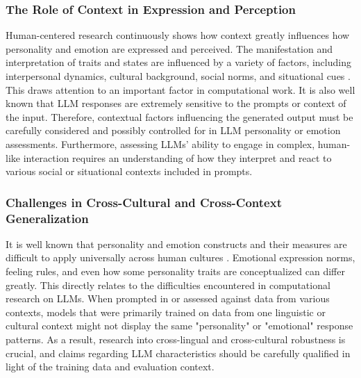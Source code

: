 \documentclass{DESSThesis}
\begin{document}
\subsubsection{The Role of Context in Expression and Perception}
Human-centered research continuously shows how context greatly influences how personality and emotion are expressed and perceived. The manifestation and interpretation of traits and states are influenced by a variety of factors, including interpersonal dynamics, cultural background, social norms, and situational cues \cite{hochschild_emotion_1979,van_kleef_how_2009,parkinson_current_2015}. This draws attention to an important factor in computational work. It is also well known that LLM responses are extremely sensitive to the prompts or context of the input. Therefore, contextual factors influencing the generated output must be carefully considered and possibly controlled for in LLM personality or emotion assessments. Furthermore, assessing LLMs' ability to engage in complex, human-like interaction requires an understanding of how they interpret and react to various social or situational contexts included in prompts.

\subsubsection{Challenges in Cross-Cultural and Cross-Context Generalization}
It is well known that personality and emotion constructs and their measures are difficult to apply universally across human cultures \cite{feng_five-factor_2024,kamarulzaman_confirmatory_2012,mun_science_2022}. Emotional expression norms, feeling rules, and even how some personality traits are conceptualized can differ greatly. This directly relates to the difficulties encountered in computational research on LLMs. When prompted in or assessed against data from various contexts, models that were primarily trained on data from one linguistic or cultural context might not display the same "personality" or "emotional" response patterns. As a result, research into cross-lingual and cross-cultural robustness is crucial, and claims regarding LLM characteristics should be carefully qualified in light of the training data and evaluation context.
\end{document}
